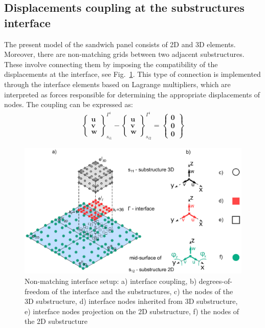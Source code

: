 \documentclass[materials,article,submit,moreauthors,pdftex]{Definitions/mdpi}
\begin{document}
\subsection{Displacements coupling at the substructures interface}
\label{sec:interface}
The present model of the sandwich panel consists of 2D and 3D elements. 
Moreover, there are non-matching grids between two adjacent substructures. 
These involve connecting them by imposing the compatibility of the displacements at the interface, see Fig.~\ref{fig:interface}.
This type of connection is implemented through the interface elements based on Lagrange multipliers, which are interpreted as forces responsible for determining the appropriate displacements of nodes.
The coupling can be expressed as:
\begin{eqnarray}
\left\{\begin{array}{c}
\textbf{u}\\
\textbf{v}\\
\textbf{w}
\end{array}\right\}_{s_{i1}}^{\Gamma^i}-
\left\{\begin{array}{c}
\textbf{u}\\
\textbf{v}\\
\textbf{w}
\end{array}\right\}_{s_{i2}}^{\Gamma^i}=
\left\{\begin{array}{c}
\textbf{0}\\
\textbf{0}\\
\textbf{0}
\end{array}\right\}
\label{eq:coupling}
\end{eqnarray}
\begin{figure}
	\begin{center}
		\includegraphics[width=1\linewidth]{../../figures/eps/interface_2D3D.eps}
	\end{center}
	\caption{Non-matching interface setup: a) interface coupling, b) degrees-of-freedom of the interface and the substructures, c) the nodes of the 3D substructure, d) interface nodes inherited from 3D substructure, e) interface nodes projection on the 2D substructure, f) the nodes of the 2D substructure}
	\label{fig:interface}
\end{figure}
\end{document}
